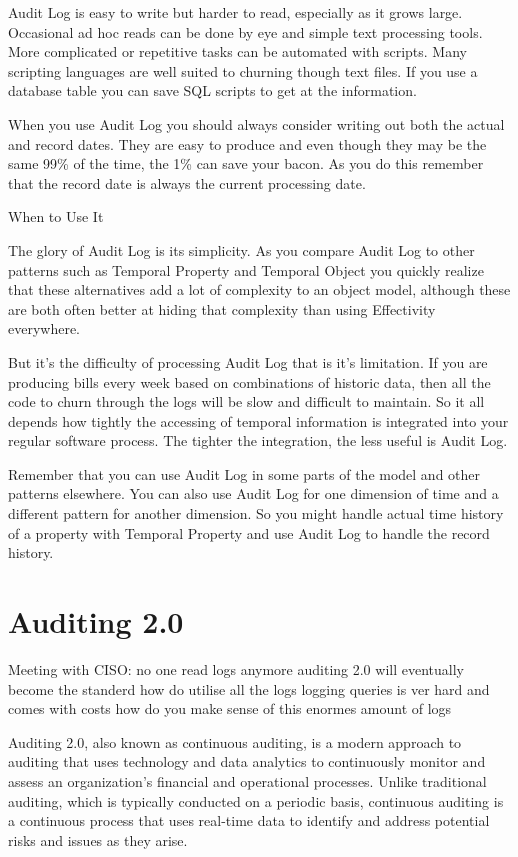 Audit Log is easy to write but harder to read, especially as it grows large. Occasional ad hoc reads can be done by eye and simple text processing tools. More complicated or repetitive tasks can be automated with scripts. Many scripting languages are well suited to churning though text files. If you use a database table you can save SQL scripts to get at the information.

When you use Audit Log you should always consider writing out both the actual and record dates. They are easy to produce and even though they may be the same 99\% of the time, the 1\% can save your bacon. As you do this remember that the record date is always the current processing date.

When to Use It

The glory of Audit Log is its simplicity. As you compare Audit Log to other patterns such as Temporal Property and Temporal Object you quickly realize that these alternatives add a lot of complexity to an object model, although these are both often better at hiding that complexity than using Effectivity everywhere.

But it's the difficulty of processing Audit Log that is it's limitation. If you are producing bills every week based on combinations of historic data, then all the code to churn through the logs will be slow and difficult to maintain. So it all depends how tightly the accessing of temporal information is integrated into your regular software process. The tighter the integration, the less useful is Audit Log.

Remember that you can use Audit Log in some parts of the model and other patterns elsewhere. You can also use Audit Log for one dimension of time and a different pattern for another dimension. So you might handle actual time history of a property with Temporal Property and use Audit Log to handle the record history.

\section{Auditing 2.0}\label{sec:adt2}

Meeting with CISO:
no one read logs anymore
auditing 2.0 will eventually become the standerd
how do utilise all the logs
logging queries is ver hard and comes with costs
how do you make sense of this enormes amount of logs

Auditing 2.0, also known as continuous auditing, is a modern approach to auditing that uses technology and data analytics to continuously monitor and assess an organization's financial and operational processes. Unlike traditional auditing, which is typically conducted on a periodic basis, continuous auditing is a continuous process that uses real-time data to identify and address potential risks and issues as they arise.

